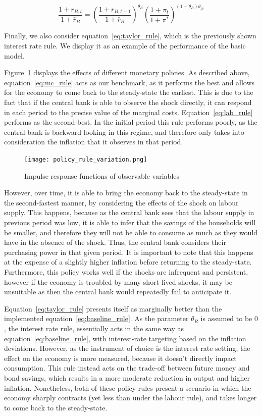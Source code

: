 \documentclass[12pt]{article}
\begin{document}
\begin{equation}\label{eq:taylor_rule}
    \frac{1 + r_{B,t}}{1 + \bar{r}_B} = \left( \frac{1 + r_{B,t-1}}{1 + \bar{r}_B} \right)^{\theta_R} \left( \frac{1 + \pi_t}{1 + \pi^*} \right)^{(1 - \theta_R)\theta_{pi}}
\end{equation}

Finally, we also consider equation~\ref{eq:taylor_rule}, which is the previously shown interest rate rule. We display it as an example of the performance of the basic model.  

\newpage
Figure~\ref{fig:policy_rule_variation} displays the effects of different monetary policies. As described above, equation~\ref{eq:mc_rule} acts as our benchmark, as it performs the best and allows for the economy to come back to the steady-state the earliest. This is due to the fact that if the central bank is able to observe the shock directly, it can respond in each period to the precise value of the marginal costs. Equation~\ref{eq:lab_rule} performs as the second-best. In the initial period this rule performs poorly, as the central bank is backward looking in this regime, and therefore only takes into consideration the inflation that it observes in that period.  

\begin{figure}[!h]
    \caption{Impulse response functions of observable variables}\label{fig:policy_rule_variation}
    \centering
    \texttt{[image: policy\_rule\_variation.png]}
\end{figure}

However, over time, it is able to bring the economy back to the steady-state in the second-fastest manner, by considering the effects of the shock on labour supply. This happens, because as the central bank sees that the labour supply in previous period was low, it is able to infer that the savings of the households will be smaller, and therefore they will not be able to consume as much as they would have in the absence of the shock. Thus, the central bank considers their purchasing power in that given period. It is important to note that this happens at the expense of a slightly higher inflation before returning to the steady-state. Furthermore, this policy works well if the shocks are infrequent and persistent, however if the economy is troubled by many short-lived shocks, it may be unsuitable as then the central bank would repeatedly fail to anticipate it.

Equation~\ref{eq:taylor_rule} presents itself as marginally better than the implemented equation~\ref{eq:baseline_rule}. As the parameter $\theta_R$ is assumed to be $0$, the interest rate rule, essentially acts in the same way as equation~\ref{eq:baseline_rule}, with interest-rate targeting based on the inflation deviations. However, as the instrument of choice is the interest rate setting, the effect on the economy is more measured, because it doesn't directly impact consumption. This rule instead acts on the trade-off between future money and bond savings, which results in a more moderate reduction in output and higher inflation. Nonetheless, both of these policy rules present a scenario in which the economy sharply contracts (yet less than under the labour rule), and takes longer to come back to the steady-state. 
\end{document}
